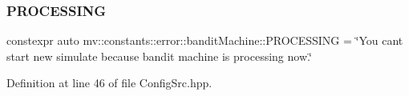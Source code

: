 \subsubsection{P\+R\+O\+C\+E\+S\+S\+I\+NG}
{\footnotesize\ttfamily constexpr auto mv\+::constants\+::error\+::bandit\+Machine\+::\+P\+R\+O\+C\+E\+S\+S\+I\+NG = \char`\"{}You can\textquotesingle{}t start new simulate because bandit machine is processing now.\char`\"{}}



Definition at line 46 of file Config\+Src.\+hpp.

